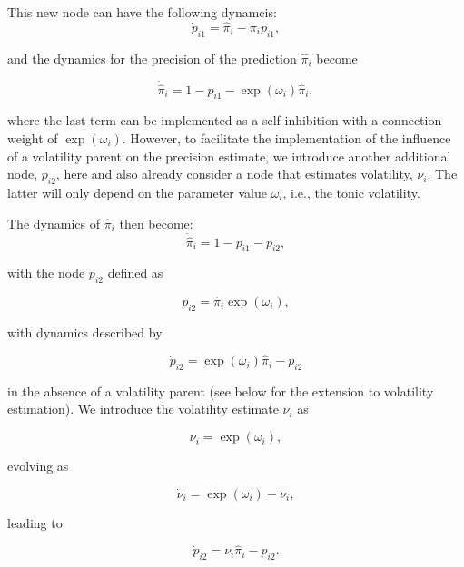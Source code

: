 This new node can have the following dynamcis:
\begin{equation}
	\dot{p}_{i1} = \hat{\pi}_i - \pi_i p_{i1}, 
\end{equation}

and the dynamics for the precision of the prediction $\hat{\pi}_i$ become

\begin{equation}
	\dot{\hat{\pi}}_i = 1 - p_{i1} - \exp(\omega_i) \hat{\pi}_i,
\end{equation}

where the last term can be implemented as a self-inhibition with a connection weight of $\exp(\omega_i)$. However, to facilitate the implementation of the influence of a volatility parent on the precision estimate, we introduce another additional node, $p_{i2}$, here and also already consider a node that estimates volatility, $\nu_i$. The latter will only depend on the parameter value $\omega_i$, i.e., the tonic volatility.

The dynamics of $\hat{\pi}_i$ then become:
\begin{equation}
	\dot{\hat{\pi}}_i = 1 - p_{i1} - p_{i2},
\end{equation}

with the node $p_{i2}$ defined as 

\begin{equation}
	p_{i2} = \hat{\pi}_i \exp(\omega_i),
\end{equation}

with dynamics described by

\begin{equation}
	\dot{p}_{i2} = \exp(\omega_i) \hat{\pi}_i - p_{i2}
\end{equation}

in the absence of a volatility parent (see below for the extension to volatility estimation). We introduce the volatility estimate $\nu_i$ as

\begin{equation}
	\nu_i = \exp(\omega_i),
\end{equation}
 
 evolving as

\begin{equation}
	\dot{\nu}_i = \exp(\omega_i) - \nu_i,
\end{equation}

leading to 

\begin{equation}
	\dot{p}_{i2} = \nu_i \hat{\pi}_i - p_{i2}.
\end{equation}

